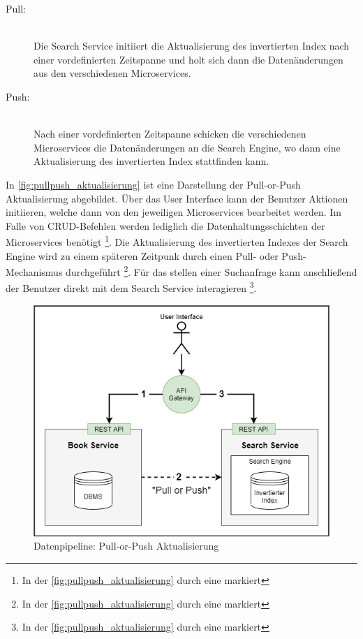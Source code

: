 \begin{description}
    \item[Pull:]\hfill \\
    Die Search Service initiiert die Aktualisierung des invertierten Index nach einer vordefinierten Zeitspanne und holt sich dann die Datenänderungen aus den verschiedenen Microservices.
    
    \item[Push:]\hfill \\
    Nach einer vordefinierten Zeitspanne schicken die verschiedenen Microservices die Datenänderungen an die Search Engine, wo dann eine Aktualisierung des invertierten Index stattfinden kann.

\end{description}

In \autoref{fig:pullpush_aktualisierung} ist eine Darstellung der Pull-or-Push Aktualisierung abgebildet. Über das User Interface kann der Benutzer Aktionen initiieren, welche dann von den jeweiligen Microservices bearbeitet werden. Im Falle von CRUD-Befehlen werden lediglich die Datenhaltungsschichten der Microservices benötigt \footnote{In der \autoref{fig:pullpush_aktualisierung} durch eine \grqq{} markiert}. Die Aktualisierung des invertierten Indexes der Search Engine wird zu einem späteren Zeitpunk durch einen Pull- oder Push-Mechanismus durchgeführt \footnote{In der \autoref{fig:pullpush_aktualisierung} durch eine \grqq{} markiert}. Für das stellen einer Suchanfrage kann anschließend der Benutzer direkt mit dem Search Service interagieren \footnote{In der \autoref{fig:pullpush_aktualisierung} durch eine \grqq{} markiert}.

\begin{figure}[H]
    \centering
    \includegraphics[width=0.6\linewidth]{images/pullpush_aktualisierung.png}
    \caption{Datenpipeline: Pull-or-Push Aktualisierung}
    \label{fig:pullpush_aktualisierung}
\end{figure}

